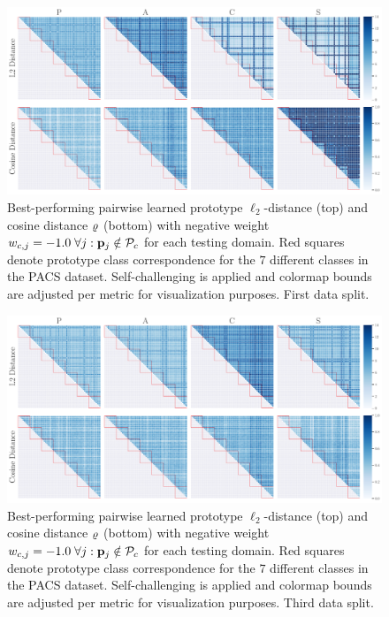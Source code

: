 \begin{figure}[t]
    \centering
    \includegraphics[width=\textwidth]{Figures/Chapter4/2021-01-21-ProDropIncorrectWeight-1.0WithSCdrop_f0.5SAVEResNet18oracle_validation_trial0.pdf}
    \caption[First data split pairwise self-challenging prototype distances with $w_{c,j} = -1.0$] {Best-performing pairwise learned prototype $\ell_2$-distance (top) and cosine distance $\varrho$ (bottom) with negative weight $w_{c,j} = -1.0\; \forall j: \mathbf{p}_{j} \notin \mathcal{P}_c$ for each testing domain. Red squares denote prototype class correspondence for the $7$ different classes in the PACS dataset. Self-challenging is applied and colormap bounds are adjusted per metric for visualization purposes. First data split.}
    \label{fig:pairwise_distance_sc}
\end{figure}

\begin{figure}[h]
    \centering
    \includegraphics[width=\textwidth]{Figures/Chapter4/2021-01-21-ProDropIncorrectWeight-1.0WithSCdrop_f0.5SAVEResNet18oracle_validation_trial2.pdf}
    \caption[Third data split pairwise self-challenging prototype distances with $w_{c,j} = -1.0$] {Best-performing pairwise learned prototype $\ell_2$-distance (top) and cosine distance $\varrho$ (bottom) with negative weight $w_{c,j} = -1.0\; \forall j: \mathbf{p}_{j} \notin \mathcal{P}_c$ for each testing domain. Red squares denote prototype class correspondence for the $7$ different classes in the PACS dataset. Self-challenging is applied and colormap bounds are adjusted per metric for visualization purposes. Third data split.}
\end{figure}



